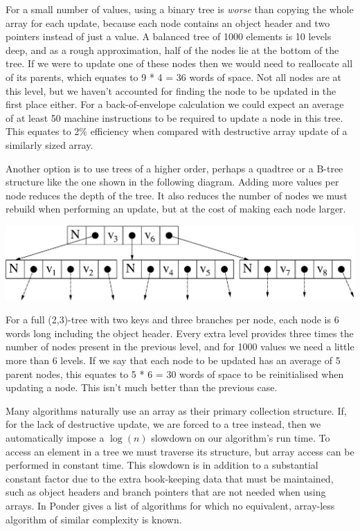 For a small number of values, using a binary tree is \emph{worse} than copying the whole array for each update, because each node contains an object header and two pointers instead of just a value. A balanced tree of 1000 elements is 10 levels deep, and as a rough approximation, half of the nodes lie at the bottom of the tree. If we were to update one of these nodes then we would need to reallocate all of its parents, which equates to 9 * 4 = 36 words of space. Not all nodes are at this level, but we haven't accounted for finding the node to be updated in the first place either. For a back-of-envelope calculation we could expect an average of at least 50 machine instructions to be required to update a node in this tree. This equates to 2\% efficiency when compared with destructive array update of a similarly sized array.

Another option is to use trees of a higher order, perhaps a quadtree or a B-tree structure like the one shown in the following diagram. Adding more values per node reduces the depth of the tree. It also reduces the number of nodes we must rebuild when performing an update, but at the cost of making each node larger. 

\begin{center}
\includegraphics[scale=0.5]{1-Introduction/fig/destructive/data-btree}
\end{center}

For a full (2,3)-tree with two keys and three branches per node, each node is 6 words long including the object header. Every extra level provides three times the number of nodes present in the previous level, and for 1000 values we need a little more than 6 levels. If we say that each node to be updated has an average of 5 parent nodes, this equates to 5 * 6 = 30 words of space to be reinitialised when updating a node. This isn't much better than the previous case.

Many algorithms naturally use an array as their primary collection structure. If, for the lack of destructive update, we are forced to a tree instead, then we automatically impose a $\log(n)$ slowdown on our algorithm's run time. To access an element in a tree we must traverse its structure, but array access can be performed in constant time. This slowdown is in addition to a substantial constant factor due to the extra book-keeping data that must be maintained, such as object headers and branch pointers that are not needed when using arrays. In \cite{ponder:inefficient} Ponder gives a list of algorithms for which no equivalent, array-less algorithm of similar complexity is known. 



